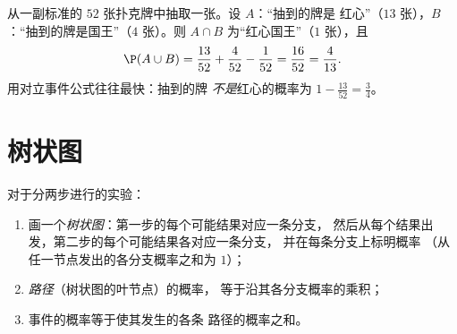 \begin{example}\label{ex:g10:proba:cards}
从一副标准的 $52$ 张扑克牌中抽取一张。设 $A$：“抽到的牌是
红心”（$13$ 张），$B$：“抽到的牌是国王”（$4$ 张）。则
$A \cap B$ 为“红心国王”（$1$ 张），且
\[
\P(A \cup B) = \frac{13}{52} + \frac{4}{52} - \frac{1}{52} = \frac{16}{52}
= \frac{4}{13}.
\]
用对立事件公式往往最快：抽到的牌
\emph{不是}红心的概率为 $1 - \frac{13}{52} = \frac34$。
\end{example}

\section{树状图}

\begin{method}[两步实验]\label{met:g10:proba:tree}
对于分两步进行的实验：
\begin{enumerate}
  \item 画一个\emph{树状图}：第一步的每个可能结果对应一条分支，
        然后从每个结果出发，第二步的每个可能结果各对应一条分支，
        并在每条分支上标明概率
        （从任一节点发出的各分支概率之和为 $1$）；
  \item \emph{路径}（树状图的叶节点）的概率，
        等于沿其各分支概率的乘积；
  \item 事件的概率等于使其发生的各条
        路径的概率之和。
\end{enumerate}
\end{method}

